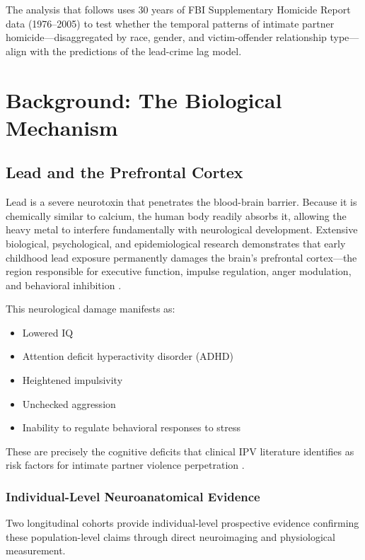 \documentclass[12pt, letterpaper]{article}
\begin{document}
The analysis that follows uses 30 years of FBI Supplementary Homicide Report data (1976--2005) to test whether the temporal patterns of intimate partner homicide---disaggregated by race, gender, and victim-offender relationship type---align with the predictions of the lead-crime lag model.

\section{Background: The Biological Mechanism}

\subsection{Lead and the Prefrontal Cortex}

Lead is a severe neurotoxin that penetrates the blood-brain barrier. Because it is chemically similar to calcium, the human body readily absorbs it, allowing the heavy metal to interfere fundamentally with neurological development. Extensive biological, psychological, and epidemiological research demonstrates that early childhood lead exposure permanently damages the brain's prefrontal cortex---the region responsible for executive function, impulse regulation, anger modulation, and behavioral inhibition \citep{reyes2007, nevin2007, needleman1979}.

This neurological damage manifests as:
\begin{itemize}[nosep]
    \item Lowered IQ
    \item Attention deficit hyperactivity disorder (ADHD)
    \item Heightened impulsivity
    \item Unchecked aggression
    \item Inability to regulate behavioral responses to stress
\end{itemize}

These are precisely the cognitive deficits that clinical IPV literature identifies as risk factors for intimate partner violence perpetration \citep{pmcimpulse2023, pmcaggression2023}.

\subsubsection{Individual-Level Neuroanatomical Evidence}

Two longitudinal cohorts provide individual-level prospective evidence confirming these population-level claims through direct neuroimaging and physiological measurement.
\end{document}
